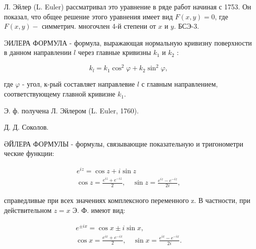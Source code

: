 \documentclass[10pt]{article}
\begin{document}
Л. Эйлер (L. Euler) рассматривал это уравнение в ряде работ начиная с 1753. Он показал, что общее решение этого уравнения имеет вид $F(x, y)=0$, где $F(x, y)-$ симметрич. многочлен 4-й степени от $x$ и $y$. БСЭ-3.



ЭИЛЕРА ФОРМУЛА - формула, выражающая нормальную кривизну поверхности в данном направлении $l$ через главные кривизны $k_{1}$ и $k_{2}$ :



\[

k_{l}=k_{1} \cos ^{2} \varphi+k_{2} \sin ^{2} \varphi,

\]



где $\varphi$ - угол, к-рый составляет направлевие $l$ с главным направлением, соответствующему главной кривизне $k_{1}$.



Э. ф. получена Л. Эйлером (L. Euler, 1760).



Д. Д. Соколов.



ӘЙЛЕРА ФОРМУЛЫ - формулы, связывающие показательную и тригонометри ческие функции:



\[

\begin{gathered}

e^{i z}=\cos z+i \sin z \\

\cos z=\frac{e^{i z}+e^{-i z}}{2}, \quad \sin z=\frac{e^{i z}-e^{-i z}}{2 i},

\end{gathered}

\]



справедливые при всех значениях комплексного переменного z. В частности, при действительном $z=x$ Э. Ф. имеют вид:



\[

\begin{gathered}

e^{ \pm i x}=\cos x \pm i \sin x, \\

\cos x=\frac{e^{i x}+e^{-i x}}{2}, \quad \sin x=\frac{e^{i x}-e^{-i x}}{2 i} .

\end{gathered}

\]
\end{document}
